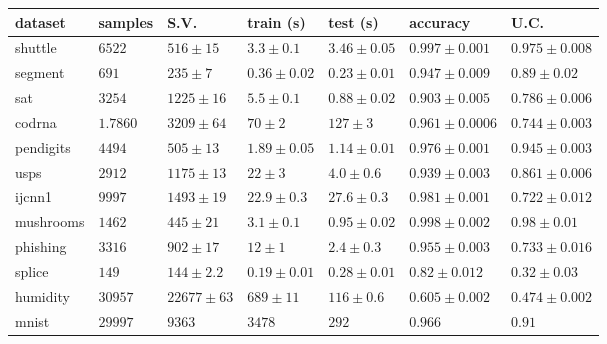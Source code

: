 \begin{tabular}{|l|llllll|}
	\hline
	dataset & samples & S.V. & train (s) & test (s) & accuracy & U.C. \\\hline
shuttle  & $    6522$ & $         516\pm       15$ & $        3.3\pm     0.1$ & $        3.46\pm    0.05$ & $       0.997\pm   0.001$ & $       0.975\pm   0.008$\\
segment  & $         691$ & $         235\pm      7$ & $       0.36\pm    0.02$ & $       0.23\pm   0.01$ & $       0.947\pm   0.009$ & $       0.89\pm    0.02$\\
sat  & $    3254$ & $    1225\pm       16$ & $        5.5\pm     0.1$ & $        0.88\pm    0.02$ & $       0.903\pm   0.005$ & $       0.786\pm   0.006$\\
codrna  & $    1.7860$ & $    3209\pm       64$ & $        70\pm      2$ & $         127\pm      3$ & $       0.961\pm  0.0006$ & $       0.744\pm   0.003$\\
pendigits  & $    4494$ & $         505\pm       13$ & $        1.89\pm    0.05$ & $        1.14\pm    0.01$ & $       0.976\pm   0.001$ & $       0.945\pm   0.003$\\
usps  & $    2912$ & $    1175\pm       13$ & $        22\pm      3$ & $        4.0\pm     0.6$ & $       0.939\pm   0.003$ & $       0.861\pm    0.006$\\
ijcnn1  & $       9997$ & $    1493\pm       19$ & $        22.9\pm     0.3$ & $        27.6\pm     0.3$ & $       0.981\pm  0.001$ & $       0.722\pm    0.012$\\
mushrooms  & $    1462$ & $         445\pm       21$ & $        3.1\pm     0.1$ & $       0.95\pm    0.02$ & $       0.998\pm   0.002$ & $        0.98\pm    0.01$\\
phishing  & $    3316$ & $         902\pm       17$ & $        12\pm      1$ & $        2.4\pm      0.3$ & $       0.955\pm   0.003$ & $       0.733\pm    0.016$\\
splice  & $         149$ & $         144\pm      2.2$ & $       0.19\pm    0.01$ & $       0.28\pm    0.01$ & $        0.82\pm    0.012$ & $        0.32\pm    0.03$\\
humidity  & $     30957$ & $    22677\pm       63$ & $         689\pm       11$ & $         116\pm      0.6$ & $       0.605\pm   0.002$ & $       0.474\pm   0.002$\\
mnist  & $       29997$ & $    9363$ & $    3478$ & $         292$ & $       0.966$ & $        0.91$\\
\hline
\end{tabular}
